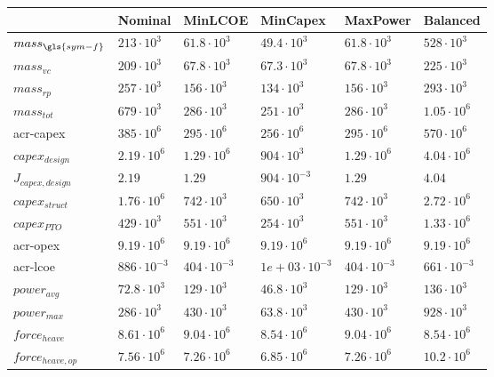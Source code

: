 \begin{tabular}{llllll}
& Nominal & MinLCOE & MinCapex & MaxPower & Balanced\\ 
\hline 
$mass_{\gls{sym-f}}$ & $213 \cdot 10^{3}$ & $61.8 \cdot 10^{3}$ & $49.4 \cdot 10^{3}$ & $61.8 \cdot 10^{3}$ & $528 \cdot 10^{3}$ \\ 
$mass_{vc}$ & $209 \cdot 10^{3}$ & $67.8 \cdot 10^{3}$ & $67.3 \cdot 10^{3}$ & $67.8 \cdot 10^{3}$ & $225 \cdot 10^{3}$ \\ 
$mass_{rp}$ & $257 \cdot 10^{3}$ & $156 \cdot 10^{3}$ & $134 \cdot 10^{3}$ & $156 \cdot 10^{3}$ & $293 \cdot 10^{3}$ \\ 
$mass_{tot}$ & $679 \cdot 10^{3}$ & $286 \cdot 10^{3}$ & $251 \cdot 10^{3}$ & $286 \cdot 10^{3}$ & $1.05 \cdot 10^{6}$ \\ 
\gls{acr-capex} & $385 \cdot 10^{6}$ & $295 \cdot 10^{6}$ & $256 \cdot 10^{6}$ & $295 \cdot 10^{6}$ & $570 \cdot 10^{6}$ \\ 
$capex_{design}$ & $2.19 \cdot 10^{6}$ & $1.29 \cdot 10^{6}$ & $904 \cdot 10^{3}$ & $1.29 \cdot 10^{6}$ & $4.04 \cdot 10^{6}$ \\ 
$J_{capex,design}$ & $2.19 $ & $1.29 $ & $904 \cdot 10^{-3}$ & $1.29 $ & $4.04 $ \\ 
$capex_{struct}$ & $1.76 \cdot 10^{6}$ & $742 \cdot 10^{3}$ & $650 \cdot 10^{3}$ & $742 \cdot 10^{3}$ & $2.72 \cdot 10^{6}$ \\ 
$capex_{PTO}$ & $429 \cdot 10^{3}$ & $551 \cdot 10^{3}$ & $254 \cdot 10^{3}$ & $551 \cdot 10^{3}$ & $1.33 \cdot 10^{6}$ \\ 
\gls{acr-opex} & $9.19 \cdot 10^{6}$ & $9.19 \cdot 10^{6}$ & $9.19 \cdot 10^{6}$ & $9.19 \cdot 10^{6}$ & $9.19 \cdot 10^{6}$ \\ 
\gls{acr-lcoe} & $886 \cdot 10^{-3}$ & $404 \cdot 10^{-3}$ & $1e+03 \cdot 10^{-3}$ & $404 \cdot 10^{-3}$ & $661 \cdot 10^{-3}$ \\ 
$power_{avg}$ & $72.8 \cdot 10^{3}$ & $129 \cdot 10^{3}$ & $46.8 \cdot 10^{3}$ & $129 \cdot 10^{3}$ & $136 \cdot 10^{3}$ \\ 
$power_{max}$ & $286 \cdot 10^{3}$ & $430 \cdot 10^{3}$ & $63.8 \cdot 10^{3}$ & $430 \cdot 10^{3}$ & $928 \cdot 10^{3}$ \\ 
$force_{heave}$ & $8.61 \cdot 10^{6}$ & $9.04 \cdot 10^{6}$ & $8.54 \cdot 10^{6}$ & $9.04 \cdot 10^{6}$ & $8.54 \cdot 10^{6}$ \\ 
$force_{heave,op}$ & $7.56 \cdot 10^{6}$ & $7.26 \cdot 10^{6}$ & $6.85 \cdot 10^{6}$ & $7.26 \cdot 10^{6}$ & $10.2 \cdot 10^{6}$ \\ 

\end{tabular}
